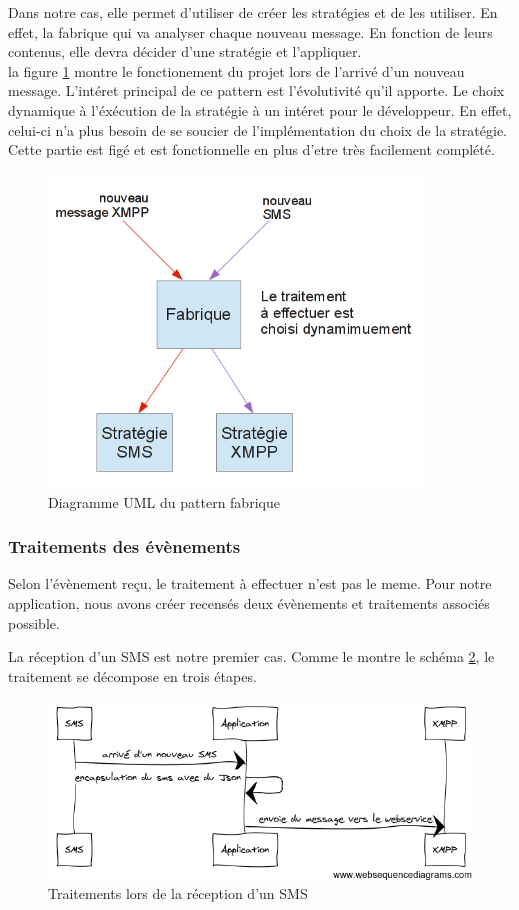 Dans notre cas, elle permet d'utiliser de créer les stratégies et de les utiliser. En effet, la fabrique 
qui va analyser chaque nouveau message. En fonction de leurs contenus, elle devra décider d'une stratégie
et l'appliquer.
\\
la figure \ref{fonctionnement-strategie-factorie} montre le fonctionement du projet lors de l'arrivé d'un
nouveau message. L'intéret principal de ce pattern est l'évolutivité qu'il apporte. Le choix dynamique à
l'éxécution de la stratégie à un intéret pour le développeur. En effet, celui-ci n'a plus besoin de se
soucier de l'implémentation du choix de la stratégie. Cette partie est figé et est fonctionnelle en plus d'etre
très facilement complété.

\begin{figure}[H]
	\center
	\includegraphics[width=10cm]{img/fonctionnement-strategie-factorie.png}
	\caption{Diagramme UML du pattern fabrique}
	\label{fonctionnement-strategie-factorie}
\end{figure}


\subsubsection{Traitements des évènements}

Selon l'évènement reçu, le traitement à effectuer n'est pas le meme. Pour notre application, nous avons 
créer recensés deux évènements et traitements associés possible.

La réception d'un SMS est notre premier cas. Comme le montre le schéma \ref{encapsulation-sms}, le traitement se 
décompose en trois étapes. 

\begin{figure}[!h]
	\center
	\includegraphics[width=12cm]{img/encapsulation-sms.png}
	\caption{Traitements lors de la réception d'un SMS}
	\label{encapsulation-sms}
\end{figure}

